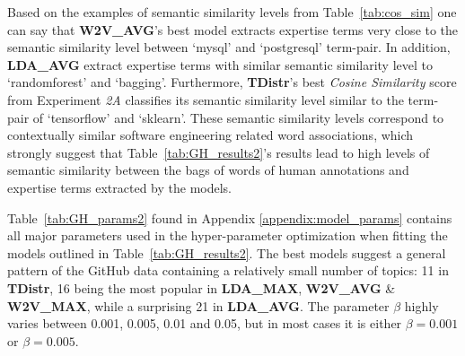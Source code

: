             Based on the examples of semantic similarity levels from Table~\ref{tab:cos_sim} one can say that \textbf{W2V\_AVG}'s best model extracts expertise terms very close to the semantic similarity level between `mysql' and `postgresql' term-pair. In addition, \textbf{LDA\_AVG} extract expertise terms with similar semantic similarity level to `randomforest' and `bagging'. Furthermore, \textbf{TDistr}'s best \emph{Cosine Similarity} score from Experiment \emph{2A} classifies its semantic similarity level similar to the term-pair of `tensorflow' and `sklearn'. These semantic similarity levels correspond to contextually similar software engineering related word associations, which strongly suggest that Table~\ref{tab:GH_results2}'s results lead to high levels of semantic similarity between the bags of words of human annotations and expertise terms extracted by the models.
             
            Table~\ref{tab:GH_params2} found in Appendix \ref{appendix:model_params} contains all major parameters used in the hyper-parameter optimization when fitting the models outlined in Table~\ref{tab:GH_results2}. The best models suggest a general pattern of the GitHub data containing a relatively small number of topics: 11 in \textbf{TDistr}, 16 being the most popular in \textbf{LDA\_MAX}, \textbf{W2V\_AVG} \& \textbf{W2V\_MAX}, while a surprising 21 in \textbf{LDA\_AVG}. The parameter $\beta$ highly varies between 0.001, 0.005, 0.01 and 0.05, but in most cases it is either $\beta=0.001$ or $\beta=0.005$.
            

